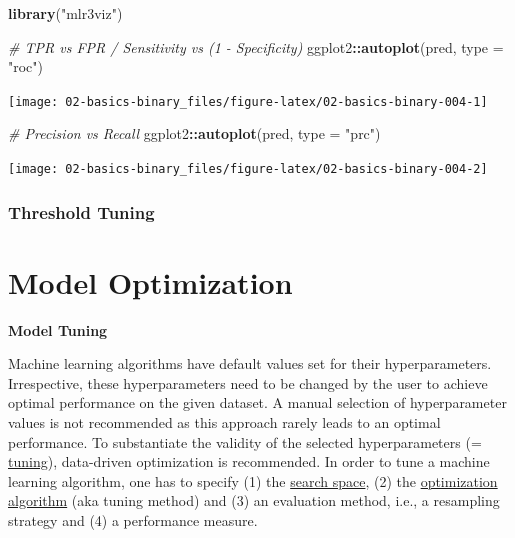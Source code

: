 \documentclass[]{scrbook}
\newenvironment{Shaded}{\begin{snugshade}}{\end{snugshade}}
\newcommand{\CommentTok}[1]{\textcolor[rgb]{0.56,0.35,0.01}{\textit{#1}}}
\newcommand{\DataTypeTok}[1]{\textcolor[rgb]{0.13,0.29,0.53}{#1}}
\newcommand{\KeywordTok}[1]{\textcolor[rgb]{0.13,0.29,0.53}{\textbf{#1}}}
\newcommand{\NormalTok}[1]{#1}
\newcommand{\OperatorTok}[1]{\textcolor[rgb]{0.81,0.36,0.00}{\textbf{#1}}}
\newcommand{\StringTok}[1]{\textcolor[rgb]{0.31,0.60,0.02}{#1}}
\renewenvironment{Shaded} {\begin{snugshade}\small} {\end{snugshade}}
\begin{document}
\begin{Shaded}
\begin{Highlighting}[]
\KeywordTok{library}\NormalTok{(}\StringTok{"mlr3viz"}\NormalTok{)}

\CommentTok{# TPR vs FPR / Sensitivity vs (1 - Specificity)}
\NormalTok{ggplot2}\OperatorTok{::}\KeywordTok{autoplot}\NormalTok{(pred, }\DataTypeTok{type =} \StringTok{"roc"}\NormalTok{)}
\end{Highlighting}
\end{Shaded}

\begin{center}\texttt{[image: 02-basics-binary\_files/figure-latex/02-basics-binary-004-1]} \end{center}

\begin{Shaded}
\begin{Highlighting}[]
\CommentTok{# Precision vs Recall}
\NormalTok{ggplot2}\OperatorTok{::}\KeywordTok{autoplot}\NormalTok{(pred, }\DataTypeTok{type =} \StringTok{"prc"}\NormalTok{)}
\end{Highlighting}
\end{Shaded}

\begin{center}\texttt{[image: 02-basics-binary\_files/figure-latex/02-basics-binary-004-2]} \end{center}

\hypertarget{threshold-tuning}{%
\subsection{Threshold Tuning}\label{threshold-tuning}}

\hypertarget{optimization}{%
\chapter{Model Optimization}\label{optimization}}

\textbf{Model Tuning}

Machine learning algorithms have default values set for their hyperparameters.
Irrespective, these hyperparameters need to be changed by the user to achieve optimal performance on the given dataset.
A manual selection of hyperparameter values is not recommended as this approach rarely leads to an optimal performance.
To substantiate the validity of the selected hyperparameters (= \protect\hyperlink{tuning}{tuning}), data-driven optimization is recommended.
In order to tune a machine learning algorithm, one has to specify (1) the \protect\hyperlink{tuning-optimization}{search space}, (2) the \protect\hyperlink{tuning-optimization}{optimization algorithm} (aka tuning method) and (3) an evaluation method, i.e., a resampling strategy and (4) a performance measure.
\end{document}
